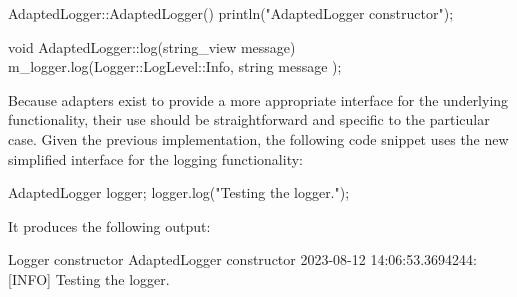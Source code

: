 \begin{cpp}
AdaptedLogger::AdaptedLogger() { println("AdaptedLogger constructor"); }

void AdaptedLogger::log(string_view message)
{
    m_logger.log(Logger::LogLevel::Info, string { message });
}
\end{cpp}


Because adapters exist to provide a more appropriate interface for the underlying functionality, their use should be straightforward and specific to the particular case. Given the previous implementation, the following code snippet uses the new simplified interface for the logging functionality:

\begin{cpp}
AdaptedLogger logger;
logger.log("Testing the logger.");
\end{cpp}

It produces the following output:

\begin{shell}
Logger constructor
AdaptedLogger constructor
2023-08-12 14:06:53.3694244: [INFO] Testing the logger.
\end{shell}











